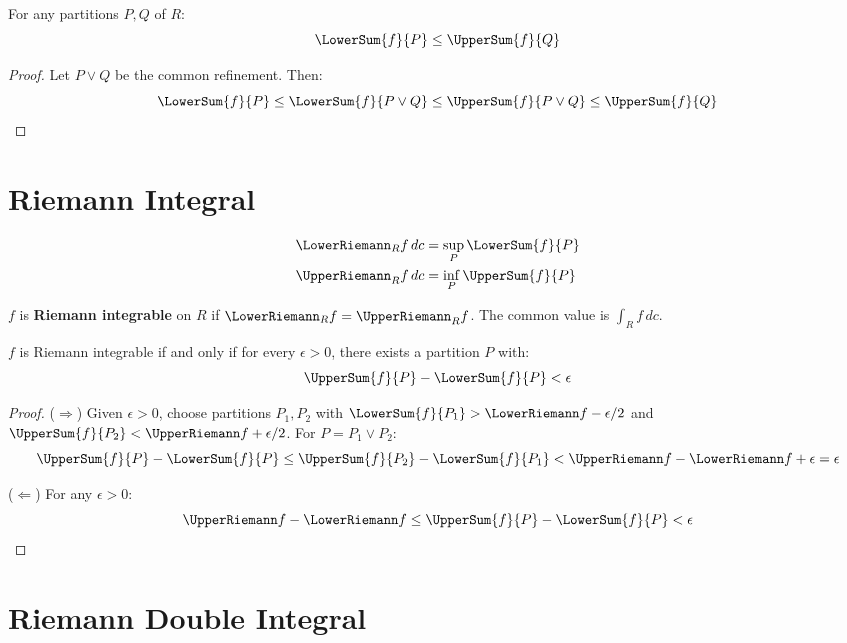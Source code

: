 \begin{proposition}
For any partitions $P, Q$ of $R$:
\[ \LowerSum{f}{P} \leq \UpperSum{f}{Q} \]
\end{proposition}

\begin{proof}
Let $P \vee Q$ be the common refinement. Then:
\[ \LowerSum{f}{P} \leq \LowerSum{f}{P \vee Q} \leq \UpperSum{f}{P \vee Q} \leq \UpperSum{f}{Q} \]
\end{proof}

\section{Riemann Integral}

\begin{definition}
\begin{align*}
    \LowerRiemann_R f \, dc &= \sup_P \LowerSum{f}{P} \\
    \UpperRiemann_R f \, dc &= \inf_P \UpperSum{f}{P}
\end{align*}
\end{definition}

\begin{definition}
$f$ is \textbf{Riemann integrable} on $R$ if $\LowerRiemann_R f = \UpperRiemann_R f$. The common value is $\int_R f \, dc$.
\end{definition}

\begin{theorem}
$f$ is Riemann integrable if and only if for every $\epsilon > 0$, there exists a partition $P$ with:
\[ \UpperSum{f}{P} - \LowerSum{f}{P} < \epsilon \]
\end{theorem}

\begin{proof}
($\Rightarrow$) Given $\epsilon > 0$, choose partitions $P_1, P_2$ with $\LowerSum{f}{P_1} > \LowerRiemann f - \epsilon/2$ and $\UpperSum{f}{P_2} < \UpperRiemann f + \epsilon/2$. For $P = P_1 \vee P_2$:
\[ \UpperSum{f}{P} - \LowerSum{f}{P} \leq \UpperSum{f}{P_2} - \LowerSum{f}{P_1} < \UpperRiemann f - \LowerRiemann f + \epsilon = \epsilon \]

($\Leftarrow$) For any $\epsilon > 0$:
\[ \UpperRiemann f - \LowerRiemann f \leq \UpperSum{f}{P} - \LowerSum{f}{P} < \epsilon \]
\end{proof}

\section{Riemann Double Integral}

